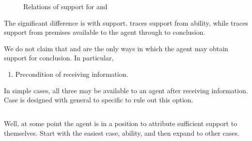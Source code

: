 \begin{note}[Diagram]
\begin{figure}[h]
\begin{subfigure}{.5\textwidth}
    \caption{\WR{}}
    \label{fig:WR:support}
  \end{subfigure}
  \caption{Relations of support for \AR{} and \WR{}}
  \label{fig:ARandWR:support}
\end{figure}
\end{note}

\begin{note}
  The significant difference is with support.
  \AR{} traces support from ability, while \WR{} traces support from premises available to the agent through to conclusion.
\end{note}

\begin{note}
  We do not claim that \AR{} and \WR{} are the only ways in which the agent may obtain support for conclusion.
  In particular,
  \begin{enumerate}
  \item Precondition of receiving information.
  \end{enumerate}
  In simple cases, all three may be available to an agent after receiving information.
  Case is designed with general to specific to rule out this option.
\end{note}

\subsection{\AR{}}
\label{sec:ar}

\begin{note}
  Well, at some point the agent is in a position to attribute sufficient support to themselves.
  Start with the easiest case, ability, and then expand to other cases.
\end{note}

